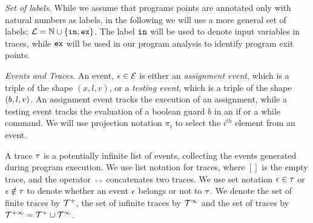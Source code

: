 \noindent\emph{Set of labels.} While we assume that programs points are annotated only with natural numbers as labels, in the following we will use a more general set of labels: $\mathcal{L} = \mathbb{N}\cup\{\mathtt{in},\mathtt{ex}\}$. The label $\mathtt{in}$ will be used to denote input variables in traces, while $\mathtt{ex}$ will be used in our program analysis to identify program exit points.



\noindent\emph{Events and Traces.} 
An event, $\mathtt{\epsilon} \in \mathcal{E}$ is either an \emph{assignment event}, which is  a triple of the shape $({x}, l,v)$, or a \emph{testing event}, which is a triple of the shape $(b, l, v)$. An assignment event tracks the execution of an assignment, while a testing event tracks the evaluation
of a boolean guard $b$ in an if or a while command.
We will use projection notation $\pi_i$ to select the $i^{th}$ element
from an event.


A trace $\mathtt{\tau}$ is a potentially infinite list of events, 
collecting the events generated  during program execution. 
We use list notation for traces, where $[]$ is the empty trace, and
the operator ${\scriptscriptstyle ++}$ concatenates two traces. We use set notation $\mathtt{\epsilon} \in \mathtt{\tau}$ or $\mathtt{\epsilon} \notin \mathtt{\tau}$ to denote whether an event $\mathtt{\epsilon}$ belongs or not to $\mathtt{\tau}$.
{
We denote the set of finite traces by $\mathcal{T}^{+}$, the set of infinite traces by $\mathcal{T}^{\infty}$ and the set of traces by $\mathcal{T}^{+\infty} = \mathcal{T}^{+} \cup \mathcal{T}^{\infty}$.
}


